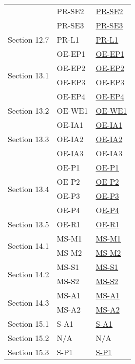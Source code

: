 \documentclass[12pt, titlepage]{article}
\begin{document}
\begin{longtable}{|p{3cm}|p{4cm}|p{4cm}|}
  \cline{2-3}
  & PR-SE2 & \hyperref[PR]{PR-SE2} \\
  \cline{2-3}
  & PR-SE3 & \hyperref[PR]{PR-SE3} \\
  \hline
  \multirow{1}{3cm}{Section 12.7} 
  & PR-L1 & \hyperref[PR]{PR-L1} \\
  \hline
  \multirow{4}{3cm}{Section 13.1} 
  & OE-EP1 & \hyperref[OE]{OE-EP1} \\
  \cline{2-3}
  & OE-EP2 & \hyperref[OE]{OE-EP2} \\
  \cline{2-3}
  & OE-EP3 & \hyperref[OE]{OE-EP3} \\
  \cline{2-3}
  & OE-EP4 & \hyperref[OE]{OE-EP4} \\
  \hline
  \multirow{1}{3cm}{Section 13.2} 
  & OE-WE1 & \hyperref[OE]{OE-WE1} \\
  \hline
  \multirow{3}{3cm}{Section 13.3} 
  & OE-IA1 & \hyperref[OE]{OE-IA1} \\
  \cline{2-3}
  & OE-IA2 & \hyperref[OE]{OE-IA2} \\
  \cline{2-3}
  & OE-IA3 & \hyperref[OE]{OE-IA3} \\
  \hline
  \multirow{4}{3cm}{Section 13.4} 
  & OE-P1 & \hyperref[OE]{OE-P1} \\
  \cline{2-3}
  & OE-P2 & \hyperref[OE]{OE-P2} \\
  \cline{2-3}
  & OE-P3 & \hyperref[OE]{OE-P3} \\
  \cline{2-3}
  & OE-P4 & O\hyperref[OE]{E-P4} \\
  \hline
  \multirow{1}{3cm}{Section 13.5} 
  & OE-R1 & \hyperref[OE]{OE-R1} \\
  \hline
  \multirow{2}{3cm}{Section 14.1} 
  & MS-M1 & \hyperref[MS]{MS-M1} \\
  \cline{2-3}
  & MS-M2 & \hyperref[MS]{MS-M2} \\
  \hline
  \multirow{2}{3cm}{Section 14.2} 
  & MS-S1 & \hyperref[MS]{MS-S1} \\
  \cline{2-3}
  & MS-S2 & \hyperref[MS]{MS-S2} \\
  \hline
  \multirow{2}{3cm}{Section 14.3} 
  & MS-A1 & \hyperref[MS]{MS-A1} \\
  \cline{2-3}
  & MS-A2 & \hyperref[MS]{MS-A2} \\
  \hline
  \multirow{1}{3cm}{Section 15.1} 
  & S-A1 & \hyperref[S]{S-A1} \\
  \hline
  \multirow{1}{3cm}{Section 15.2} 
  & N/A & N/A \\
  \hline
  \multirow{3}{3cm}{Section 15.3} 
  & S-P1 & \hyperref[S]{S-P1} \\

\end{longtable}
\end{document}
